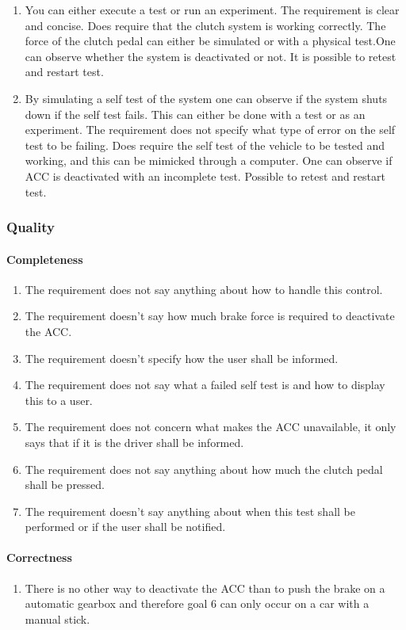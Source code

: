 \begin{enumerate}
    \item You can either execute a test or run an experiment. The requirement is clear and concise. Does require that the clutch system is working correctly. The force of the clutch pedal can either be simulated or with a physical test.One can observe whether the system is deactivated or not. It is possible to retest and restart test.
    \item By simulating a self test of the system one can observe if the system shuts down if the self test fails. This can either be done with a test or as an experiment. The requirement does not specify what type of error on the self test to be failing. Does require the self test of the vehicle to be tested and working, and this can be mimicked through a computer. One can observe if ACC is deactivated with an incomplete test. Possible to retest and restart test.
\end{enumerate}


\subsubsection{Quality}
\paragraph{Completeness}
\begin{enumerate}
    \item The requirement does not say anything about how to handle this control.
    \item The requirement doesn't say how much brake force is required to deactivate the ACC.
    \item The requirement doesn't specify how the user shall be informed.
    \item The requirement does not say what a failed self test is and how to display this to a user.
    \item The requirement does not concern what makes the ACC unavailable, it only says that if it is the driver shall be informed.
    \item The requirement does not say anything about how much the clutch pedal shall be pressed.
    \item The requirement doesn't say anything about when this test shall be performed or if the user shall be notified.
\end{enumerate}


\paragraph{Correctness}
\begin{enumerate}
    \item There is no other way to deactivate the ACC than to push the brake on a automatic gearbox and therefore goal 6 can only occur on a car with a manual stick.
\end{enumerate}


